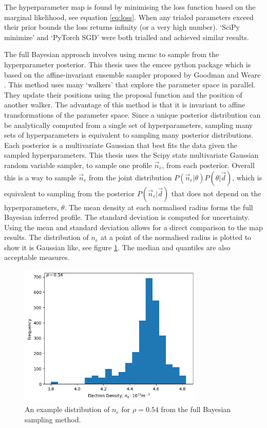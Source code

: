 The hyperparameter \gls{map} is found by minimising the loss function based on the marginal likelihood, see equation \ref{eq:loss}. When any trialed parameters exceed their prior bounds the loss returns infinity (or a very high number). `SciPy minimize' and `PyTorch SGD' were both trialled and achieved similar results.

The full Bayesian approach involves using \gls{mcmc} to sample from the hyperparameter posterior. This thesis uses the emcee python package which is based on the affine-invariant ensemble sampler proposed by Goodman and Weare \cite{emceeGoodman}. This method uses many `walkers' that explore the parameter space in parallel. They update their positions using the proposal function and the position of another walker. The advantage of this method is that it is invariant to affine transformations of the parameter space. Since a unique posterior distribution can be analytically computed from a single set of hyperparameters, sampling many sets of hyperparameters is equivalent to sampling many posterior distributions. Each posterior is a multivariate Gaussian that best fits the data given the sampled hyperparameters. This thesis uses the Scipy stats multivariate Gaussian random variable sampler, to sample one profile $\vec n_e$, from each posterior. Overall this is a way to sample $\vec n_e$ from the joint distribution $P(\vec n_e|\theta) P(\theta|\vec d)$, which is equivalent to sampling from the posterior $P(\vec n_e|\vec d)$ that does not depend on the hyperparameters, $\theta$. The mean density at each normalised radius forms the full Bayesian inferred profile. The standard deviation is computed for uncertainty. Using the mean and standard deviation allows for a direct comparison to the \gls{map} results. The distribution of $n_e$ at a point of the normalised radius is plotted to show it is Gaussian like, see figure \ref{fig:ne_dist}. The median and quantiles are also acceptable measures.

\begin{figure}[H]
    \centering
    \includegraphics[width=250pt]{images/Final/sampled_ne_dist.png}
    \caption{An example distribution of $n_e$ for $\rho=0.54$ from the full Bayesian sampling method.}
    \label{fig:ne_dist}
\end{figure}

